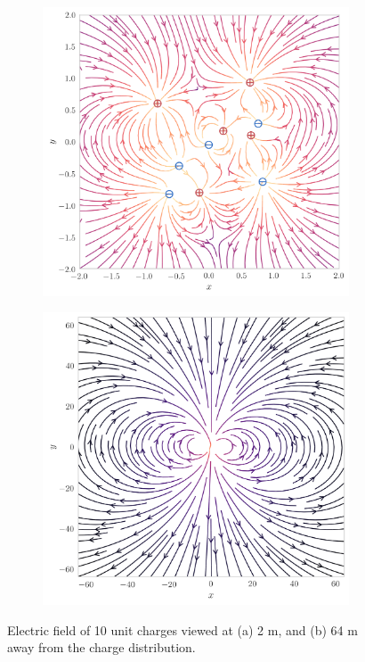 \documentclass[10pt,a4paper,twoside]{article}
\begin{document}
\begin{figure}[tb]
    \centering
	\begin{subfigure}[h!]{0.45\textwidth}
		\centering
		\includegraphics[width=\textwidth]{117-2.png}
		\caption{}
		\label{fig:field-2m}
	\end{subfigure}
	\begin{subfigure}[h!]{0.45\textwidth}
		\centering
		\includegraphics[width=\textwidth]{117-64.png}
		\caption{}
		\label{fig:field-64m}
	\end{subfigure}
	\caption{Electric field of 10 unit charges viewed at (a) 2 m, and (b) 64 m away from the charge distribution.}
	\label{fig:field}
\end{figure}
\end{document}
